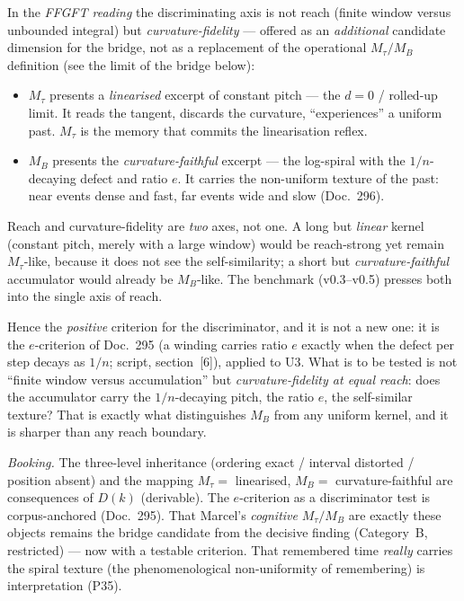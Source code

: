 In the \emph{FFGFT reading} the discriminating axis is not reach (finite window versus
unbounded integral) but \emph{curvature-fidelity} --- offered as an \emph{additional}
candidate dimension for the bridge, not as a replacement of the operational $M_\tau/M_B$
definition (see the limit of the bridge below):
\begin{itemize}
\item $M_\tau$ presents a \emph{linearised} excerpt of constant pitch --- the $d=0$ / rolled-up
limit. It reads the tangent, discards the curvature, \enquote{experiences} a uniform past.
$M_\tau$ is the memory that commits the linearisation reflex.
\item $M_B$ presents the \emph{curvature-faithful} excerpt --- the log-spiral with the
$1/n$-decaying defect and ratio $e$. It carries the non-uniform texture of the past: near
events dense and fast, far events wide and slow (Doc.~296).
\end{itemize}

Reach and curvature-fidelity are \emph{two} axes, not one. A long but \emph{linear} kernel
(constant pitch, merely with a large window) would be reach-strong yet remain $M_\tau$-like,
because it does not see the self-similarity; a short but \emph{curvature-faithful} accumulator
would already be $M_B$-like. The benchmark (v0.3--v0.5) presses both into the single axis of
reach.

Hence the \emph{positive} criterion for the discriminator, and it is not a new one: it is the
$e$-criterion of Doc.~295 (a winding carries ratio $e$ exactly when the defect per step
decays as $1/n$; script, section~[6]), applied to U3. What is to be tested is not
\enquote{finite window versus accumulation} but \emph{curvature-fidelity at equal reach}: does
the accumulator carry the $1/n$-decaying pitch, the ratio $e$, the self-similar texture? That
is exactly what distinguishes $M_B$ from any uniform kernel, and it is sharper than any reach
boundary.

\emph{Booking.} The three-level inheritance (ordering exact / interval distorted / position
absent) and the mapping $M_\tau=$ linearised, $M_B=$ curvature-faithful are consequences of
$D(k)$ (derivable). The $e$-criterion as a discriminator test is corpus-anchored (Doc.~295).
That Marcel's \emph{cognitive} $M_\tau/M_B$ are exactly these objects remains the bridge candidate from
the decisive finding (Category~B, restricted) --- now with a testable criterion. That
remembered time \emph{really} carries the spiral texture (the phenomenological non-uniformity
of remembering) is interpretation (P35).

